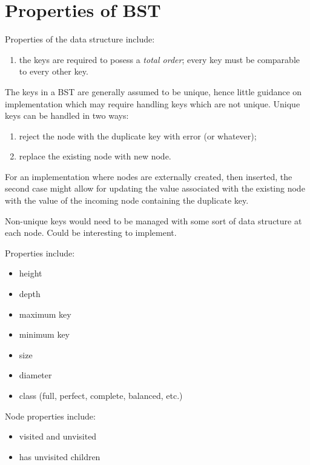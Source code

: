 \section{Properties of BST}

Properties of the data structure include:

\begin{enumerate}
  \item the keys are required to posess a \textit{total order}; every key must
        be comparable to every other key.
\end{enumerate}

The keys in a BST are generally assumed to be unique, hence little guidance on
implementation which may require handling keys which are not unique. Unique keys
can be handled in two ways:

\begin{enumerate}
  \item reject the node with the duplicate key with error (or whatever);
  \item replace the existing node with new node.
\end{enumerate}

For an implementation where nodes are externally created, then inserted,
the second case might allow for updating the value associated with the existing
node with the value of the incoming node containing the duplicate key.

Non-unique keys would need to be managed with some sort of data structure at
each node. Could be interesting to implement.

Properties include:

\begin{itemize}
  \item height
  \item depth
  \item maximum key
  \item minimum key
  \item size
  \item diameter
  \item class (full, perfect, complete, balanced, etc.)
\end{itemize}

Node properties include:

\begin{itemize}
  \item visited and unvisited
  \item has unvisited children
\end{itemize}

